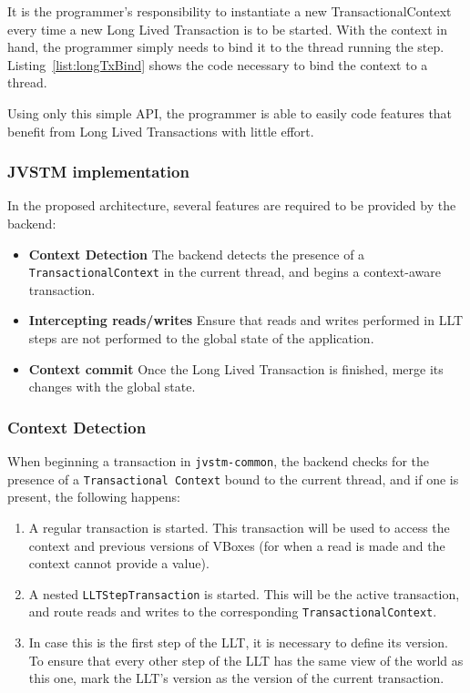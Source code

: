 \documentclass{llncs}
\begin{document}
It is the programmer's responsibility to instantiate a new
TransactionalContext every time a new Long Lived Transaction is to be
started. With the context in hand, the programmer simply needs to bind
it to the thread running the step. Listing~\ref{list:longTxBind} shows
the code necessary to bind the context to a thread.

Using only this simple API, the programmer is able to easily code
features that benefit from Long Lived Transactions with little effort.

\subsubsection{JVSTM implementation}

In the proposed architecture, several features are required to be
provided by the backend:

\begin{itemize}

\item {\bf Context Detection} The backend detects the presence of a
  \texttt{TransactionalContext} in the current thread, and begins a
  context-aware transaction.

\item {\bf Intercepting reads/writes} Ensure that reads and writes
  performed in LLT steps are not performed to the global state of the
  application.

\item {\bf Context commit} Once the Long Lived Transaction is
  finished, merge its changes with the global state.

\end{itemize}

\subsubsection{Context Detection}

When beginning a transaction in \texttt{jvstm-common}, the backend
checks for the presence of a \texttt{Transactional Context} bound to
the current thread, and if one is present, the following happens:

\begin{enumerate}

\item A regular transaction is started. This transaction will be used
  to access the context and previous versions of VBoxes (for when a
  read is made and the context cannot provide a value).

\item A nested \texttt{LLTStepTransaction} is started. This will be the
  active transaction, and route reads and writes to the corresponding
  \texttt{TransactionalContext}.

\item In case this is the first step of the LLT, it is necessary to
  define its version. To ensure that every other step of the LLT has
  the same view of the world as this one, mark the LLT's version as
  the version of the current transaction.

\end{enumerate}
\end{document}
